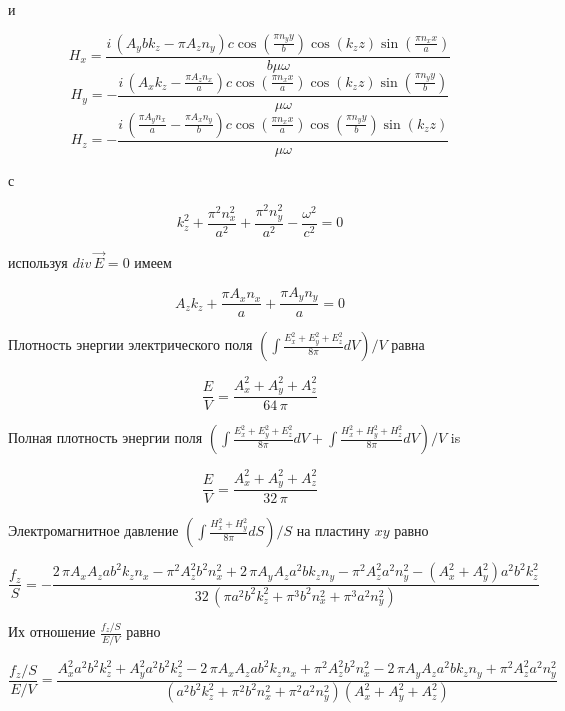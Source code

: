 \documentclass[11pt]{article}
\begin{document}
и

\[H_{x} = \frac{i \, {\left(A_{y} b k_{z} - \pi A_{z} n_{y}\right)} c \cos\left(\frac{\pi n_{y} y}{b}\right) \cos\left(k_{z} z\right) \sin\left(\frac{\pi n_{x} x}{a}\right)}{b \mu \omega}\]
\[H_{y} = -\frac{i \, {\left(A_{x} k_{z} - \frac{\pi A_{z} n_{x}}{a}\right)} c \cos\left(\frac{\pi n_{x} x}{a}\right) \cos\left(k_{z} z\right) \sin\left(\frac{\pi n_{y} y}{b}\right)}{\mu \omega}\]
\[H_{z} = -\frac{i \, {\left(\frac{\pi A_{y} n_{x}}{a} - \frac{\pi A_{x} n_{y}}{b}\right)} c \cos\left(\frac{\pi n_{x} x}{a}\right) \cos\left(\frac{\pi n_{y} y}{b}\right) \sin\left(k_{z} z\right)}{\mu \omega}\]

с

\[k_{z}^{2} + \frac{\pi^{2} n_{x}^{2}}{a^{2}} + \frac{\pi^{2} n_{y}^{2}}{a^{2}} - \frac{\omega^{2}}{c^{2}} = 0\]

используя \(div\,\vec{E} = 0\) имеем

\[A_{z} k_{z} + \frac{\pi A_{x} n_{x}}{a} + \frac{\pi A_{y} n_{y}}{a} = 0\]

Плотность энергии электрического поля
\(\left(\int \frac{E_x^2+E_y^2+E_z^2}{8 \pi}dV\right)\big/{V}\) равна

\[\frac{E}{V} = \frac{{A_{x}^{2} + A_{y}^{2} + A_{z}^{2}}}{64 \, \pi}\]

    Полная плотность энергии поля
\(\left(\int \frac{E_x^2+E_y^2+E_z^2}{8 \pi}dV + \int \frac{H_x^2+H_y^2+H_z^2}{8 \pi}dV\right)\big/{V}\)
is

    \[\frac{E}{V} = \frac{{A_{x}^{2} + A_{y}^{2} + A_{z}^{2}}}{32 \, \pi}\]

    Электромагнитное давление
\(\left({\int \frac {H_x^2+H_y^2}{8 \pi} dS}\right)\big/{S}\) на
пластину \(xy\) равно

    \[\frac{f_z}{S} = -\frac{2 \, \pi A_{x} A_{z} a b^{2} k_{z} n_{x} - \pi^{2} A_{z}^{2} b^{2} n_{x}^{2} + 2 \, \pi A_{y} A_{z} a^{2} b k_{z} n_{y} - \pi^{2} A_{z}^{2} a^{2} n_{y}^{2} - {\left(A_{x}^{2} + A_{y}^{2}\right)} a^{2} b^{2} k_{z}^{2}}{32 \, {\left(\pi a^{2} b^{2} k_{z}^{2} + \pi^{3} b^{2} n_{x}^{2} + \pi^{3} a^{2} n_{y}^{2}\right)}}\]

    Их отношение \(\frac{f_z/S}{E/V}\) равно

    \[\frac{f_z/S}{E/V} = \frac{A_{x}^{2} a^{2} b^{2} k_{z}^{2} + A_{y}^{2} a^{2} b^{2} k_{z}^{2} - 2 \, \pi A_{x} A_{z} a b^{2} k_{z} n_{x} + \pi^{2} A_{z}^{2} b^{2} n_{x}^{2} - 2 \, \pi A_{y} A_{z} a^{2} b k_{z} n_{y} + \pi^{2} A_{z}^{2} a^{2} n_{y}^{2}}{{\left(a^{2} b^{2} k_{z}^{2} + \pi^{2} b^{2} n_{x}^{2} + \pi^{2} a^{2} n_{y}^{2}\right)} {\left(A_{x}^{2} + A_{y}^{2} + A_{z}^{2}\right)}}\]
\end{document}
